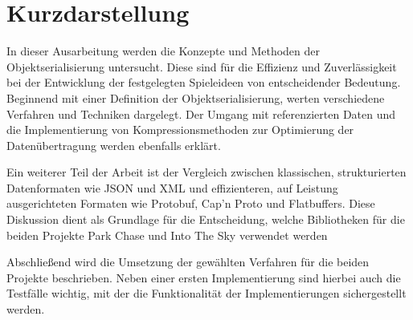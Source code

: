 \thispagestyle{empty}
\section*{Kurzdarstellung}
\label{sec:kurzdarstellung}
    
In dieser Ausarbeitung werden die Konzepte und Methoden der Objektserialisierung untersucht. Diese sind für die Effizienz und Zuverlässigkeit bei der Entwicklung der festgelegten Spieleideen von entscheidender Bedeutung. Beginnend mit einer Definition der Objektserialisierung, werten verschiedene Verfahren und Techniken dargelegt. Der Umgang mit referenzierten Daten und die Implementierung von Kompressionsmethoden zur Optimierung der Datenübertragung werden ebenfalls erklärt.

Ein weiterer Teil der Arbeit ist der Vergleich zwischen klassischen, strukturierten Datenformaten wie JSON und XML und effizienteren, auf Leistung ausgerichteten Formaten wie Protobuf, Cap’n Proto und Flatbuffers. Diese Diskussion dient als Grundlage für die Entscheidung, welche Bibliotheken für die beiden Projekte Park Chase und Into The Sky verwendet werden

Abschließend wird die Umsetzung der gewählten Verfahren für die beiden Projekte beschrieben. Neben einer ersten Implementierung sind hierbei auch die Testfälle wichtig, mit der die Funktionalität der Implementierungen sichergestellt werden.

